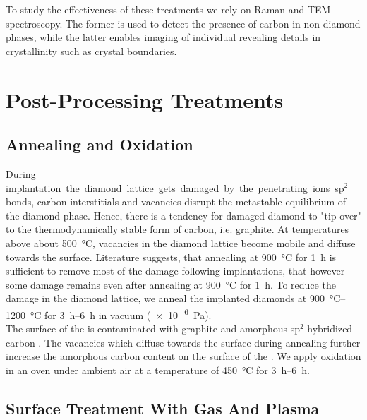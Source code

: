 To study the effectiveness of these treatments we rely on Raman and TEM spectroscopy. The former is used to detect the presence of carbon in non-diamond phases, while the latter enables imaging of individual \nds revealing details in crystallinity such as crystal boundaries.

	\section{Post-Processing Treatments}

		\subsection{Annealing and Oxidation}\label{sec::ann_ox}

		During \si implantation the diamond lattice gets damaged by the penetrating ions.
		sp$^2$ bonds, carbon interstitials and vacancies disrupt the metastable equilibrium of the diamond phase. Hence, there is a tendency for damaged diamond to "tip over" to the thermodynamically stable form of carbon, i.e. graphite.
		At temperatures above about \SI{500}{\celsius}, vacancies in the diamond lattice become mobile and diffuse towards the surface\cite{Dresselhaus1992}.
		Literature suggests, that annealing at \SI{900}{\celsius} for \SI{1}{\hour} is sufficient to remove most of the damage following implantations, that however some damage remains even after annealing at \SI{900}{\celsius} for \SI{1}{\hour}.
		To reduce the damage in the diamond lattice, we anneal the implanted diamonds at \SIrange{900}{1200}{\celsius} for \SIrange{3}{6}{h} in vacuum (\SI{e-6}{Pa}).
		\\
		The surface of the \nds is contaminated with graphite and amorphous sp$^2$ hybridized carbon .
		The vacancies which diffuse towards the surface during annealing further increase the amorphous carbon content on the surface of the \nds \cite{}.
		We apply oxidation in an oven under ambient air at a temperature of \SI{450}{\celsius} for \SIrange{3}{6}{h}.

		\subsection{Surface Treatment With Gas And Plasma}

